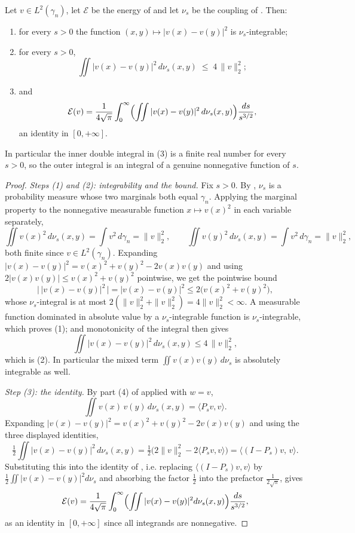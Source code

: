 \begin{lemma}
Let $v \in L^2(\gamma_n)$, let $\mathcal{E}$ be the energy of  and
let $\nu_s$ be the coupling of .  Then:
\begin{enumerate}
\item for every $s > 0$ the function
$(x,y) \mapsto |v(x)-v(y)|^2$ is $\nu_s$-integrable;
\item for every $s > 0$,
\[
  \iint |v(x)-v(y)|^2 \, d\nu_s(x,y) \;\leq\; 4\,\|v\|_2^2 ;
\]
\item and
\[
  \mathcal{E}(v)
    = \frac{1}{4\sqrt\pi}\int_0^\infty
      \Bigl(\iint |v(x) - v(y)|^2\, d\nu_s(x,y)\Bigr)\frac{ds}{s^{3/2}},
\]
an identity in $[0,+\infty]$.
\end{enumerate}
In particular the inner double integral in (3) is a finite real number for every
$s > 0$, so the outer integral is an integral of a genuine nonnegative function of
$s$.
\end{lemma}
\begin{proof}
\emph{Steps (1) and (2): integrability and the bound.}
Fix $s > 0$.  By , $\nu_s$ is a probability measure whose
two marginals both equal $\gamma_n$.  Applying the marginal property to the
nonnegative measurable function $x \mapsto v(x)^2$ in each variable separately,
\[
  \iint v(x)^2 \, d\nu_s(x,y) = \int v^2\, d\gamma_n = \|v\|_2^2 ,
  \qquad
  \iint v(y)^2 \, d\nu_s(x,y) = \int v^2 \, d\gamma_n = \|v\|_2^2 ,
\]
both finite since $v \in L^2(\gamma_n)$.  Expanding
$|v(x)-v(y)|^2 = v(x)^2 + v(y)^2 - 2v(x)v(y)$ and using
$2|v(x)v(y)| \leq v(x)^2 + v(y)^2$ pointwise, we get the pointwise bound
\[
  \bigl|\,|v(x)-v(y)|^2\,\bigr| = |v(x)-v(y)|^2 \leq 2\bigl(v(x)^2 + v(y)^2\bigr) ,
\]
whose $\nu_s$-integral is at most $2(\|v\|_2^2 + \|v\|_2^2) = 4\|v\|_2^2 < \infty$.
A measurable function dominated in absolute value by a $\nu_s$-integrable function
is $\nu_s$-integrable, which proves (1); and monotonicity of the integral then gives
\[
  \iint |v(x)-v(y)|^2 \, d\nu_s(x,y) \leq 4\,\|v\|_2^2 ,
\]
which is (2).  In particular the mixed term $\iint v(x)v(y)\,d\nu_s$ is absolutely
integrable as well.

\emph{Step (3): the identity.}
By part (4) of  applied with $w = v$,
\[
  \iint v(x)\,v(y)\, d\nu_s(x,y) = \langle P_s v, v\rangle .
\]
Expanding $|v(x)-v(y)|^2 = v(x)^2 + v(y)^2 - 2v(x)v(y)$ and using the three
displayed identities,
\[
  \tfrac12 \iint |v(x)-v(y)|^2\, d\nu_s(x,y)
    = \tfrac12\bigl(2\|v\|_2^2 - 2\langle P_s v, v\rangle\bigr)
    = \bigl\langle (I-P_s)v,\, v\bigr\rangle .
\]
Substituting this into the identity of , i.e. replacing
$\langle (I-P_s)v, v\rangle$ by $\tfrac12\iint|v(x)-v(y)|^2 d\nu_s$ and absorbing
the factor $\tfrac12$ into the prefactor $\tfrac{1}{2\sqrt\pi}$, gives
\[
  \mathcal{E}(v)
    = \frac{1}{4\sqrt\pi}\int_0^\infty
      \Bigl(\iint|v(x)-v(y)|^2 d\nu_s(x,y)\Bigr)\frac{ds}{s^{3/2}} ,
\]
as an identity in $[0,+\infty]$ since all integrands are nonnegative.
\end{proof}
